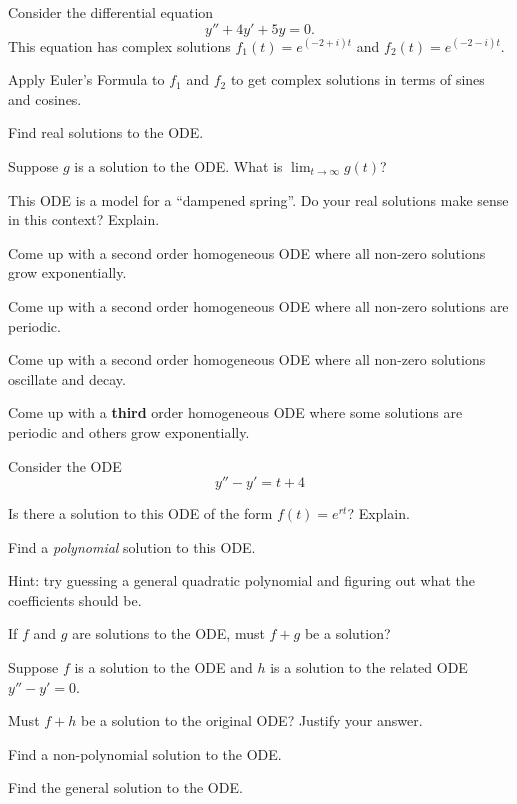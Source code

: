 \documentclass{workbook}
\begin{document}
\begin{slide}
	\question
	Consider the differential equation
	\[
		y''+4y'+5y=0.
	\]
	This equation has complex solutions $f_1(t)=e^{(-2+i)t}$
	and $f_2(t)=e^{(-2-i)t}$.

	\begin{parts}
		\item Apply Euler's Formula to $f_1$ and $f_2$ to get complex solutions in terms of sines and cosines.
		\item Find real solutions to the ODE.
		\item Suppose $g$ is a solution to the ODE. What is $\displaystyle 
		\lim_{t\to\infty} g(t)$?
		\item This ODE is a model for a ``dampened spring''. Do your
		real solutions make sense in this context? Explain.
	\end{parts}
\end{slide}


\begin{slide}
	\question

	\begin{parts}
		\item Come up with a second order homogeneous ODE where all non-zero solutions 	grow exponentially.
		\item Come up with a second order homogeneous ODE where all non-zero solutions are periodic.
		\item Come up with a second order homogeneous ODE where all non-zero solutions oscillate and decay.
		\item Come up with a \textbf{third} order homogeneous ODE where some solutions are periodic and others grow exponentially.
		
	\end{parts}
\end{slide}

\begin{slide}
	\question
	Consider the ODE
	\[
		y''-y'=t+4
	\]


	\begin{parts}
		\item Is there a solution to this ODE of the form $f(t)=e^{rt}$? Explain.
		\item Find a \emph{polynomial} solution to this ODE.

		Hint: try guessing a general quadratic polynomial and figuring out what the coefficients should be.

		\item If $f$ and $g$ are solutions to the ODE, must $f+g$ be a solution?
		
		\item Suppose $f$ is a solution to the ODE and $h$ is a solution to the
		related ODE $y''-y'=0$.

		Must $f+h$ be a solution to the original ODE? Justify your answer.

		\item Find a non-polynomial solution to the ODE.

		\item Find the general solution to the ODE.
	\end{parts}
\end{slide}
\end{document}
